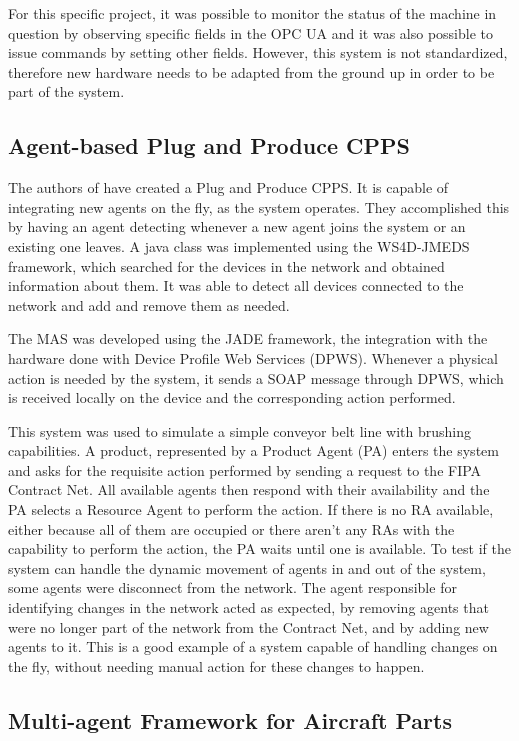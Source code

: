 For this specific project, it was possible to monitor the status of the machine in question by observing specific fields in the OPC UA and it was also possible to issue commands by setting other fields. However, this system is not standardized, therefore new hardware needs to be adapted from the ground up in order to be part of the system.

\subsection{Agent-based Plug and Produce CPPS}

The authors of \cite{8972169} have created a Plug and Produce CPPS. It is capable of integrating new agents on the fly, as the system operates. They accomplished this by having an agent detecting whenever a new agent joins the system or an existing one leaves. A java class was implemented using the WS4D-JMEDS framework, which searched for the devices in the network and obtained information about them. It was able to detect all devices connected to the network and add and remove them as needed.

The MAS was developed using the JADE framework, the integration with the hardware done with Device Profile Web Services (DPWS). Whenever a physical action is needed by the system, it sends a SOAP message through DPWS, which is received locally on the device and the corresponding action performed.

This system was used to simulate a simple conveyor belt line with brushing capabilities. A product, represented by a Product Agent (PA) enters the system and asks for the requisite action performed by sending a request to the FIPA Contract Net. All available agents then respond with their availability and the PA selects a Resource Agent to perform the action. If there is no RA available, either because all of them are occupied or there aren't any RAs with the capability to perform the action, the PA waits until one is available.
To test if the system can handle the dynamic movement of agents in and out of the system, some agents were disconnect from the network. The agent responsible for identifying changes in the network acted as expected, by removing agents that were no longer part of the network from the Contract Net, and by adding new agents to it.
This is a good example of a system capable of handling changes on the fly, without needing manual action for these changes to happen.

\subsection{Multi-agent Framework for Aircraft Parts}

